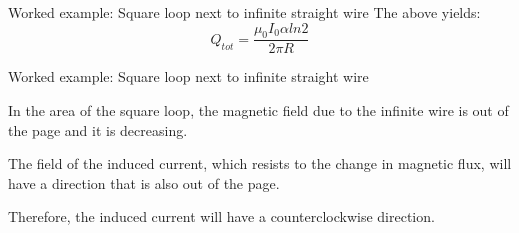 {\begin{frame}{Worked example: Square loop next to infinite straight wire}
  The above yields:
  \begin{equation*}
     Q_{tot} = \frac{\mu_0 I_0 \alpha ln2}{2\pi R}
  \end{equation*}

\end{frame}

%
%
%

\begin{frame}{Worked example: Square loop next to infinite straight wire}

  In the area of the square loop, the magnetic field due to the infinite
  wire is out of the page and it is decreasing.\\
  \vspace{0.2cm}

  The field of the induced current, which resists to the change in
  magnetic flux, will have a direction that is also out of the page.\\
  \vspace{0.2cm}

  Therefore, the induced current will have a counterclockwise direction.

\end{frame}

} %

